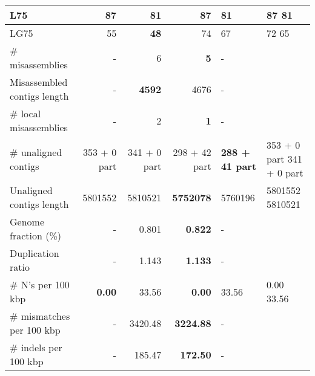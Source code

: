 \documentclass[12pt,a4paper]{article}
\begin{document}
\begin{table}[ht]
\begin{center}
\begin{tabular}{|l*{3}{|r}|}
L75 & 87 & {\bf 81} & 87 & {\bf 81} & 87                      81 \\ \hline
LG75 & 55 & {\bf 48} & 74 & 67 & 72                      65 \\ \hline
\# misassemblies & - & 6 & {\bf 5} & - \\ \hline
Misassembled contigs length & - & {\bf 4592} & 4676 & - \\ \hline
\# local misassemblies & - & 2 & {\bf 1} & - \\ \hline
\# unaligned contigs & 353 + 0 part & 341 + 0 part & 298 + 42 part & {\bf 288 + 41 part} & 353 + 0 part            341 + 0 part \\ \hline
Unaligned contigs length & 5801552 & 5810521 & {\bf 5752078} & 5760196 & 5801552                 5810521 \\ \hline
Genome fraction (\%) & - & 0.801 & {\bf 0.822} & - \\ \hline
Duplication ratio & - & 1.143 & {\bf 1.133} & - \\ \hline
\# N's per 100 kbp & {\bf 0.00} & 33.56 & {\bf 0.00} & 33.56 & 0.00                    33.56 \\ \hline
\# mismatches per 100 kbp & - & 3420.48 & {\bf 3224.88} & - \\ \hline
\# indels per 100 kbp & - & 185.47 & {\bf 172.50} & - \\ \hline
\end{tabular}
\end{center}
\end{table}
\end{document}

